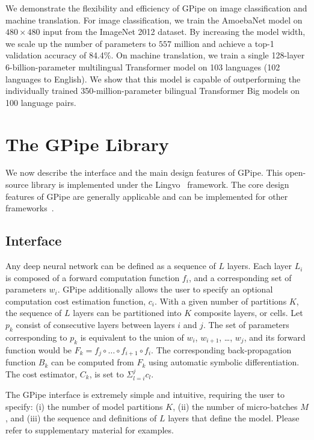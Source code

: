 \documentclass{article}
\def\codename{GPipe}
\begin{document}
We demonstrate the flexibility and efficiency of \codename{} on image classification and machine translation. For image classification, we train the AmoebaNet model on $480\times480$ input from the ImageNet 2012 dataset. By increasing the model width, we scale up the number of parameters to $557$ million and achieve a top-1 validation accuracy of 84.4\%. On machine translation, we train a single 128-layer 6-billion-parameter multilingual Transformer model on 103 languages (102 languages to English). We show that this model is capable of outperforming the individually trained 350-million-parameter bilingual Transformer Big \cite{vaswani2017attention} models on 100 language pairs.

\section{The \codename{} Library}
We now describe the interface and the main design features of \codename{}. This open-source library is implemented  under the Lingvo~\cite{shen2019lingvo} framework. The core design features of \codename{} are generally applicable and can be implemented for other frameworks~\cite{jia2014caffe, chen2015mxnet,paszke2017automatic}.

\subsection{Interface}
Any deep neural network can be defined as a sequence of $L$ layers. Each layer $L_i$ is composed of a forward computation function $f_i$, and a corresponding set of parameters $w_i$. \codename{} additionally allows the user to specify an optional computation cost estimation function, $c_i$. With a given number of partitions $K$, the sequence of $L$ layers can be partitioned into $K$ composite layers, or cells. Let  $p_k$ consist of consecutive layers between layers $i$ and $j$. The set of parameters corresponding to $p_k$ is equivalent to the union of $w_i$, $w_{i+1}$, \ldots, $w_j$, and its forward function would be $F_k = f_j \circ \ldots \circ f_{i+1} \circ f_i$. The corresponding back-propagation function $B_k$ can be computed from $F_k$ using automatic symbolic differentiation. The cost estimator, $C_k$, is set to $\Sigma_{l=i}^{j}c_l$.

The \codename{} interface is extremely simple and intuitive, requiring the user to specify: (i) the number of model partitions $K$,  (ii) the number of micro-batches $M$, and (iii) the sequence and definitions of $L$ layers that define the model. Please refer to supplementary material for examples.
\end{document}
